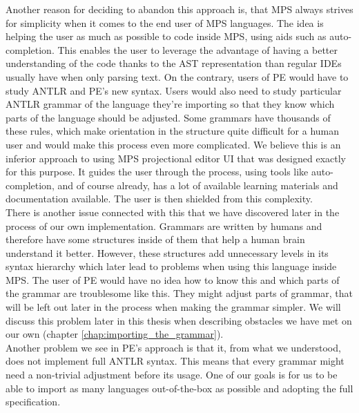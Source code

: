 Another reason for deciding to abandon this approach is, that MPS always strives for simplicity when it comes to the end user of MPS languages.
The idea is helping the user as much as possible to code inside MPS, using aids such as auto-completion.
This enables the user to leverage the advantage of having a better understanding of the code thanks to the AST representation than regular IDEs usually have when only parsing text.
On the contrary, users of PE would have to study ANTLR and PE's new syntax.
Users would also need to study particular ANTLR grammar of the language they're importing so that they know which parts of the language should be adjusted.
Some grammars have thousands of these rules, which make orientation in the structure quite difficult for a human user and would make this process even more complicated.
We believe this is an inferior approach to using MPS projectional editor UI that was designed exactly for this purpose.
It guides the user through the process, using tools like auto-completion, and of course already, has a lot of available learning materials and documentation available.
The user is then shielded from this complexity.
\\

There is another issue connected with this that we have discovered later in the process of our own implementation.
Grammars are written by humans and therefore have some structures inside of them that help a human brain understand it better.
However, these structures add unnecessary levels in its syntax hierarchy which later lead to problems when using this language inside MPS.
The user of PE would have no idea how to know this and which parts of the grammar are troublesome like this.
They might adjust parts of grammar, that will be left out later in the process when making the grammar simpler.
We will discuss this problem later in this thesis when describing obstacles we have met on our own (chapter \ref{chap:importing_the_grammar}).
\\

Another problem we see in PE's approach is that it, from what we understood, does not implement full ANTLR syntax.
This means that every grammar might need a non-trivial adjustment before its usage.
One of our goals is for us to be able to import as many languages out-of-the-box as possible and adopting the full specification.
\\

